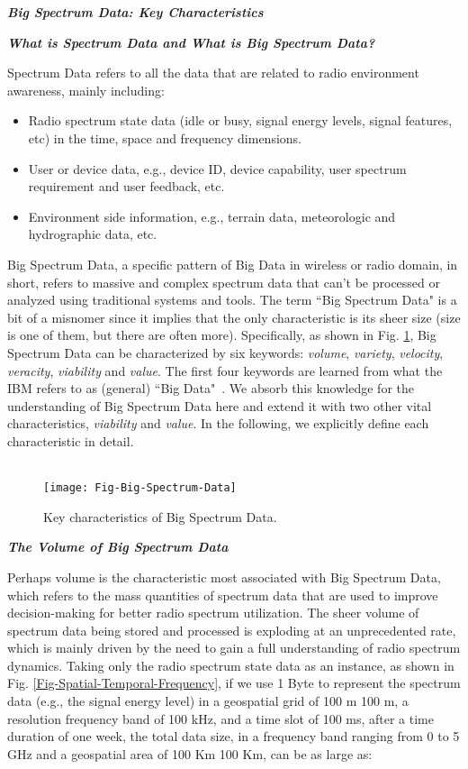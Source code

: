 \documentclass[12pt,draftcls,journal,letterpaper,oneside,onecolumn]{IEEEtran}
\begin{document}
\textbf{\emph{Big Spectrum Data: Key Characteristics}}

\textbf{\emph{What is Spectrum Data and What is Big Spectrum Data?}}

Spectrum Data refers to all the data that are related to radio environment awareness, mainly including:
\begin{itemize}
  \item Radio spectrum state data (idle or busy, signal energy levels, signal features, etc) in the time, space and frequency dimensions.
  \item User or device data, e.g., device ID, device capability, user spectrum requirement and user feedback, etc.
  \item Environment side information, e.g., terrain data, meteorologic and hydrographic data, etc.
\end{itemize}

Big Spectrum Data, a specific pattern of Big Data in wireless or radio domain, in short, refers to massive and complex spectrum data that can't be processed or analyzed using traditional systems and tools. The term ``Big Spectrum Data" is a bit of a misnomer since it implies that the only characteristic is its sheer size (size is one of them, but there are often more). Specifically, as shown in Fig. \ref{Fig-Big-Spectrum-Data}, Big Spectrum Data can be characterized by six keywords: \emph{volume}, \emph{variety}, \emph{velocity}, \emph{veracity}, \emph{viability} and \emph{value}. The first four keywords are learned from what the IBM refers to as (general) ``Big Data"~\cite{IBM-real-world-use}. We absorb this knowledge for the understanding of Big Spectrum Data here and extend it with two other vital characteristics, \emph{viability} and \emph{value}. In the following, we explicitly define each characteristic in detail.
\\
\\

\begin{figure}[!b]
\centering
\texttt{[image: Fig-Big-Spectrum-Data]}
\caption{Key characteristics of Big Spectrum Data.}
\label{Fig-Big-Spectrum-Data}
\end{figure}


\textbf{\emph{The Volume of Big Spectrum Data}}

Perhaps volume is the characteristic most associated with Big Spectrum Data, which refers to the mass quantities of spectrum data that are used to improve decision-making for better radio spectrum utilization. The sheer volume of spectrum data being stored and processed is exploding at an unprecedented rate, which is mainly driven by the need to gain a full understanding of radio spectrum dynamics. Taking only the radio spectrum state data as an instance, as shown in Fig. \ref{Fig-Spatial-Temporal-Frequency}, if we use 1 Byte to represent the spectrum data (e.g., the signal energy level) in a geospatial grid of 100 m  100 m, a resolution frequency band of 100 kHz, and a time slot of 100 ms, after a time duration of one week, the total data size, in a frequency band ranging from 0 to 5 GHz and a geospatial area of 100 Km  100 Km, can be as large as:
\end{document}
